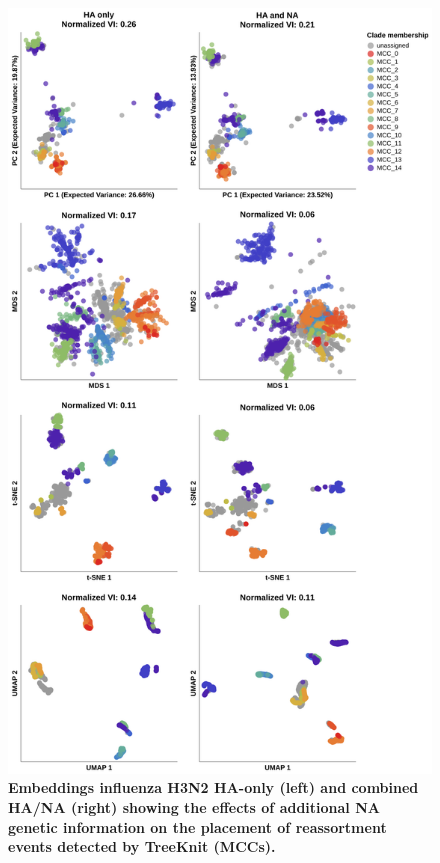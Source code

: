 \begin{figure}[!h]
\includegraphics[width=0.75\columnwidth]{figures/flu-2016-2018-ha-na-all-embeddings-by-mcc.png}
\caption{{\bf Embeddings influenza H3N2 HA-only (left) and combined HA/NA (right) showing the effects of additional NA genetic information on the placement of reassortment events detected by TreeKnit (MCCs).}}\label{S_Fig_full_ha_na_embeddings}
\end{figure}

